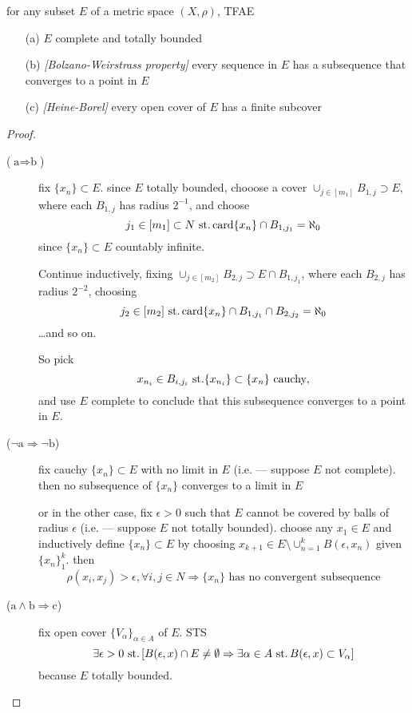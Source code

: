 \begin{thm}\label{thm:0.25}\label{thm:00-compactchar}
  for any subset $E$ of a metric space ${(X,\rho)}$, TFAE
  \begin{itemize}
  \item[(a)] $E$ complete and totally bounded
  \item[(b)] \emph{[Bolzano-Weirstrass property]}
    every sequence in $E$ has a subsequence that converges
    to a point in $E$
  \item[(c)] \emph{[Heine-Borel]}
    every open cover of $E$ has a finite subcover
  \end{itemize}
\end{thm}
\begin{proof}
  \begin{description}
  \item[(${\text{a}\Rightarrow\text{b}}$)] fix ${\{x_n\}\subset E}$.
    since $E$ totally bounded, chooose a cover
    ${\cup_{j\in[m_1]} B_{1,j} \supset E}$, where each $B_{1,j}$
    has radius $2^{-1}$, and choose
    \[
    j_1\in[m_1]\subset N \operatorname{\,st.} \operatorname{card}\{x_n\}\cap B_{1,j_1}=\aleph_0
    \]
    since ${\{x_n\}\subset E}$ countably infinite.

    Continue inductively, fixing
    ${\cup_{j\in[m_2]} B_{2,j} \supset E \cap B_{1,j_1}}$,
    where each $B_{2,j}$ has radius $2^{-2}$, choosing
    \[
    j_2\in[m_2] \operatorname{\,st.} \operatorname{card}\{x_n\}\cap B_{1,j_1}\cap B_{2,j_2}=\aleph_0
    \]
    \ldots and so on.

    So pick
    \[
    x_{n_i}\in B_{i,j_i}\operatorname{\,st.}
    \{x_{n_i}\}\subset\{x_n\}\text{ cauchy},
    \]
    and use $E$ complete to conclude that this subsequence
    converges to a point in $E$.
  \item[(${\neg\text{a}\Rightarrow\neg\text{b}}$)]
    fix cauchy ${\{x_n\}\subset E}$ with no limit in $E$
    (i.e. --- suppose $E$ not complete).
    then no subsequence of ${\{x_n\}}$ converges to a limit in $E$

    or in the other case,
    fix ${\epsilon>0}$ such that $E$ cannot be covered by balls
    of radius $\epsilon$
    (i.e. --- suppose $E$ not totally bounded).
    choose any ${x_1\in E}$ and inductively define
    ${\{x_n\}\subset E}$ by choosing
    ${x_{k+1}\in E\setminus\cup_{n=1}^k B(\epsilon, x_n)}$
    given ${\{x_n\}_1^k}$. then
    \[
    \rho(x_i,x_j)>\epsilon,\forall i,j\in N
    \Rightarrow
    \{x_n\}\text{ has no convergent subsequence}
    \]
  \item[(${\text{a}\land\text{b}\Rightarrow\text{c}}$)]
    fix open cover ${\{V_\alpha\}_{\alpha\in A}}$ of $E$.
    STS
    \[
    \exists\epsilon>0\operatorname{\,st.} \left[
      B(\epsilon, x)\cap E\neq\emptyset
      \Rightarrow
      \exists \alpha\in A\operatorname{\,st.} B(\epsilon, x)\subset V_\alpha
      \right]
    \]
    because $E$ totally bounded.


\end{description}
\end{proof}
